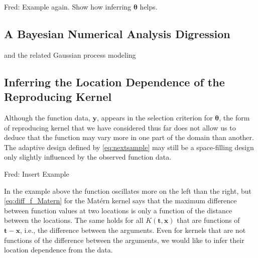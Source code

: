 \documentclass[]{mcom-l}
\theoremstyle{remark}
\newcommand{\bx}{{\boldsymbol{x}}}
\newcommand{\by}{{\boldsymbol{y}}}
\newcommand{\bt}{{\boldsymbol{t}}}
\newcommand{\btheta}{{\boldsymbol{\theta}}}
\newcommand{\FredNote}[1]{{\color{blue}Fred: #1}}
\begin{document}
\FredNote{Example again. Show how inferring $\btheta$ helps.}

\subsection{A Bayesian Numerical Analysis Digression} \label{sec:Bayes}

and the related Gaussian process modeling \cite{Dia88a,RasWil06a,Ste99}



\subsection{Inferring the Location Dependence of the Reproducing Kernel} \label{sec:InferSpace}

Although the function data, $\by$, appears in the selection criterion for $\btheta$, the form of reproducing kernel that we have considered thus far does not allow us to deduce that the function may vary more in one part of the domain than another.  The adaptive design defined by \eqref{eq:nextsample} may still be a space-filling design only slightly influenced by the observed function data.

\FredNote{Insert Example}

In the example above the function oscillates more on the left than the right, but \eqref{eq:diff_f_Matern} for the Mat\'ern kernel says that the maximum difference between function values at two locations is only a function of the distance between the locations.  The same holds for all $K(\bt ,\bx)$ that are  functions of $\bt - \bx$, i.e., the difference between the arguments.  Even for kernels that are not functions of the difference between the arguments, we would like to infer their location dependence from the data.
\end{document}
